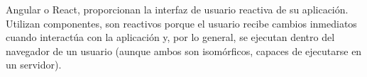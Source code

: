 Angular o React, proporcionan la interfaz de usuario reactiva de su aplicación. Utilizan componentes, son reactivos porque el usuario recibe cambios inmediatos cuando interactúa con la aplicación y, por lo general, se ejecutan dentro del navegador de un usuario (aunque ambos son isomórficos, capaces de ejecutarse en un servidor).
\vspace{0.8cm}